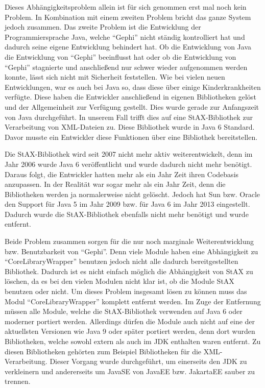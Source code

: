 Dieses Abhängigkeitsproblem allein ist für sich genommen erst mal noch kein
Problem. In Kombination mit einem zweiten Problem bricht das ganze System jedoch
zusammen. Das zweite Problem ist die Entwicklung der Programmiersprache Java,
welche \enquote{Gephi} nicht ständig kontrolliert hat und dadurch seine eigene
Entwicklung behindert hat. Ob die Entwicklung von Java die Entwicklung von
\enquote{Gephi} beeinflusst hat oder ob die Entwicklung von \enquote{Gephi}
stagnierte und anschließend nur schwer wieder aufgenommen werden konnte, lässt
sich nicht mit Sicherheit feststellen. Wie bei vielen neuen Entwicklungen, war es
auch bei Java so, dass diese über einige Kinderkrankheiten verfügte. Diese haben
die Entwickler anschließend in eigenen Bibliotheken gelöst und der Allgemeinheit
zur Verfügung gestellt. Dies wurde gerade zur Anfangszeit von Java durchgeführt.
In unserem Fall trifft dies auf eine StAX-Bibliothek zur Verarbeitung von
\gls{XML}-Dateien zu. Diese Bibliothek wurde in Java 6 Standard. Davor musste ein
Entwickler diese Funktionen über eine Bibliothek bereitstellen. 


Die StAX-Bibliothek wird seit 2007 nicht mehr aktiv weiterentwickelt, denn im
Jahr 2006 wurde Java 6 veröffentlicht und wurde dadurch nicht mehr benötigt.
Daraus folgt, die Entwickler hatten mehr als ein Jahr Zeit ihren Codebasis
anzupassen. In der Realität war sogar mehr als ein Jahr Zeit, denn die
Bibliotheken werden ja normalerweise nicht gelöscht. Jedoch hat Sun bzw. Oracle
den Support für Java 5 im Jahr 2009 bzw. für Java 6 im Jahr 2013 eingestellt.
Dadurch wurde die StAX-Bibliothek ebenfalls nicht mehr benötigt und wurde
entfernt. 

Beide Problem zusammen sorgen für die nur noch marginale Weiterentwicklung bzw.
Benutzbarkeit von \enquote{Gephi}. Denn viele Module haben eine Abhängigkeit zu
\enquote{CoreLibraryWrapper} benutzen jedoch nicht alle dadurch bereitgestellten
Bibliothek. Dadurch ist es nicht einfach möglich die Abhängigkeit von StAX zu
löschen, da es bei den vielen Modulen nicht klar ist, ob die Module StAX benutzen
oder nicht. Um dieses Problem insgesamt lösen zu können muss das Modul
\enquote{CoreLibraryWrapper} komplett entfernt werden. Im Zuge der Entfernung
müssen alle Module, welche die StAX-Bibliothek verwenden auf Java 6 oder moderner
portiert werden. Allerdings dürfen die Module auch nicht auf eine der aktuellsten
Versionen wie Java 9 oder später portiert werden, denn dort wurden Bibliotheken,
welche sowohl extern als auch im \gls{JDK} enthalten waren entfernt. Zu diesen
Bibliotheken gehörten zum Beispiel Bibliotheken für die \gls{XML}-Verarbeitung.
Dieser Vorgang wurde durchgeführt, um einerseits den JDK zu verkleinern und
andererseits um JavaSE von JavaEE bzw. JakartaEE sauber zu trennen.

